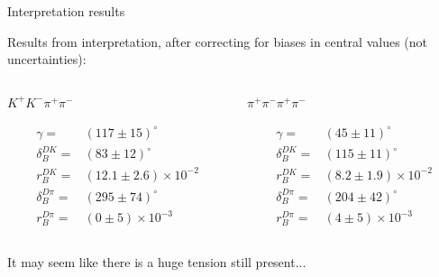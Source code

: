 \documentclass[xcolor={dvipsnames}]{beamer}
\begin{document}
\begin{frame}{Interpretation results}
  \begin{center}
    {\large Results from interpretation, after correcting for biases in central values (not uncertainties):}
  \end{center}
  \vspace{-0.5cm}
  \begin{columns}
    \begin{column}{0.5\textwidth}
      \begin{center}
        $K^+K^-\pi^+\pi^-$
      \end{center}
      \begin{align*}
        \gamma =& (117 \pm 15)^\circ \\
        \delta_B^{DK} =& (83 \pm 12)^\circ \\
        r_B^{DK} =& (12.1 \pm 2.6)\times10^{-2} \\
        \delta_B^{D\pi} =& (295 \pm 74)^\circ \\
        r_B^{D\pi} =& (0 \pm 5)\times10^{-3}
      \end{align*}
    \end{column}
    \begin{column}{0.5\textwidth}
      \begin{center}
        $\pi^+\pi^-\pi^+\pi^-$
      \end{center}
      \begin{align*}
        \gamma =& (45 \pm 11)^\circ \\
        \delta_B^{DK} =& (115 \pm 11)^\circ \\
        r_B^{DK} =& (8.2 \pm 1.9)\times10^{-2} \\
        \delta_B^{D\pi} =& (204 \pm 42)^\circ \\
        r_B^{D\pi} =& (4 \pm 5)\times10^{-3}
      \end{align*}
    \end{column}
  \end{columns}
  \vspace{0.3cm}
  \begin{center}
    It may seem like there is a huge tension still present...\\
    \phantom{...but how Gaussian are these uncertainties?}
  \end{center}
\end{frame}
\end{document}
